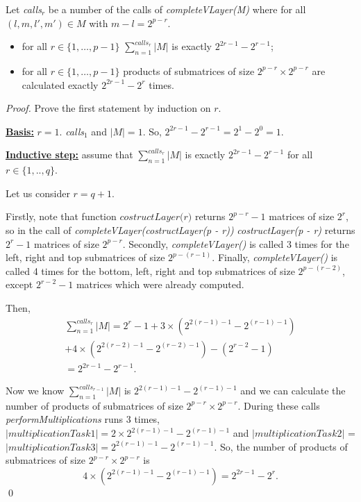 \begin{lemma}
Let \textit{calls$_{r}$} be a number of the calls of \textit{completeVLayer(M)} where for all $(l, m, l', m') \in M$ with $m - l = 2^{p - r}$.
\begin{itemize}
 \item for all $r \in \{ 1, \dots, p - 1\}$  $\sum_{n=1}^{calls_r}{|M|}$ is exactly $2^{2r - 1} - 2^{r - 1}$;
 \item for all $r \in \{ 1, \dots, p - 1\}$ products of submatrices of size $2^{p - r} \times 2^{p - r}$ are calculated exactly $2^{2r - 1} - 2^{r}$ times.
\end{itemize}
\end{lemma}

\begin{proof}

Prove the first statement by induction on $r$.

\underline{\textbf{Basis:}} $r = 1$. \textit{calls$_{1}$} and $|M| = 1$. So, $2^{2r - 1} - 2^{r - 1} = 2^1 - 2^0 = 1$.

\underline{\textbf{Inductive step:}} assume that $\sum_{n=1}^{calls_r}{|M|}$ is exactly $2^{2r - 1} - 2^{r - 1}$ for all $r \in \{ 1, .., q\}$.

Let us consider $r = q + 1$.

Firstly, note that function $\textit{costructLayer(r)}$ returns $2^{p - r} - 1$ matrices of size $2^r$, so in the call of \textit{completeVLayer(costructLayer(p - r))}  \textit{costructLayer(p - r)} returns $2^r - 1$ matrices of size $2^{p - r}$. 
Secondly, \textit{completeVLayer()} is called 3 times for the left, right and top submatrices of size $2^{p - (r - 1)}$. Finally, \textit{completeVLayer()} is called 4 times for the bottom, left, right and top submatrices of size $2^{p - (r - 2)}$, except $2^{r - 2} - 1$ matrices which were already computed.

Then, 
\begin{equation*}
\begin{array}{c}

\sum_{n=1}^{calls_r}{|M|} = 2^{r} - 1 + 3 \times (2^{2(r - 1) - 1} - 2^{(r - 1) - 1}) \\
                            + 4 \times (2^{2(r - 2) - 1} - 2^{(r - 2) - 1}) - (2^{r - 2} - 1) \\
                           = 2^{2r - 1} - 2^{r - 1} .

\end{array}
\end{equation*}

Now we know $\sum_{n=1}^{calls_{r-1}}{|M|}$  is $2^{2(r - 1) - 1} - 2^{(r - 1) - 1}$ and we can calculate the number of products of submatrices of size $2^{p - r} \times 2^{p - r}$. 
During these calls \textit{performMultiplications} runs 3 times, $|multiplicationTask1| = 2 \times 2^{2(r - 1) - 1} - 2^{(r - 1) - 1}$ and $|multiplicationTask2|$ = $|multiplicationTask3| = 2^{2(r - 1) - 1} - 2^{(r - 1) - 1}$. So, the number of products of submatrices of size $2^{p - r} \times 2^{p - r}$ is $$ 4 \times (2^{2(r - 1) - 1} - 2^{(r - 1) - 1}) = 2^{2r - 1} - 2^{r}.$$\qed
\end{proof}

